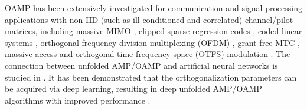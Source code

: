 \documentclass[journal]{IEEEtran}
\newcommand{\LL}[1]{\textcolor{black}{#1}}
\begin{document}
OAMP has been extensively investigated for communication and signal processing applications with non-IID (such as ill-conditioned and correlated) channel/pilot matrices, including massive MIMO \cite{KhaniANSD2020}, clipped sparse regression codes \cite{IC-SRC2021}, coded linear systems \cite{MaLiu2018}, orthogonal-frequency-division-multiplexing (OFDM) \cite{Yiyao_ofdm, HWang2019, XZhou2022, ZhangOAMP2017}, grant-free MTC \cite{SLiu2022}, massive access \cite{Yiyao_mmv} and orthogonal time frequency space (OTFS) modulation \cite{LiOTFS2022}. The connection between unfolded AMP/OAMP and artificial neural networks is studied in \cite{He2018AI, Zhang2019AI,  Takabe2019}. It has been demonstrated that the orthogonalization parameters can be acquired via deep learning, resulting in deep unfolded AMP/OAMP algorithms with improved performance \cite{He2018AI, Zhang2019AI, Takabe2019}.\vspace{3mm} 

 
 

\end{document}
